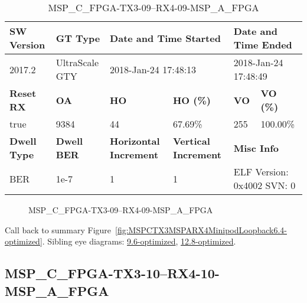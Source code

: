 \begin{table}[h]
\centering
\caption{MSP\_C\_FPGA-TX3-09--RX4-09-MSP\_A\_FPGA}
\label{tab:MSPCFPGATX309RX409MSPAFPGA6.4-optimized}
\begin{tabular}{@{}|l|l|l|l|l|l|@{}}
\toprule
\textbf{SW Version}                & \textbf{GT Type}   & \multicolumn{2}{l|}{\textbf{Date and Time Started}}            & \multicolumn{2}{l|}{\textbf{Date and Time Ended}}        \\ \midrule
2017.2                       & UltraScale GTY          & \multicolumn{2}{l|}{2018-Jan-24 17:48:13}                   & \multicolumn{2}{l|}{2018-Jan-24 17:48:49}               \\ \midrule
\textbf{Reset RX}                  & \textbf{OA} & \textbf{HO}   & \textbf{HO (\%)} & \textbf{VO} & \textbf{VO (\%)} \\ \midrule
true & 9384        & 44          & 67.69\%        & 255        & 100.00\%       \\ \midrule
\textbf{Dwell Type}                & \textbf{Dwell BER} & \textbf{Horizontal Increment} & \textbf{Vertical Increment}    & \multicolumn{2}{l|}{\textbf{Misc Info}}                  \\ \midrule
BER                            & 1e-7        & 1        & 1           & \multicolumn{2}{l|}{ELF Version: 0x4002 SVN: 0}                         \\ \bottomrule
\end{tabular}
\end{table}

\begin{figure}[h]
\caption{MSP\_C\_FPGA-TX3-09--RX4-09-MSP\_A\_FPGA} \label{fig:MSPCFPGATX309RX409MSPAFPGA6.4-optimized}
\end{figure}

Call back to summary Figure~\ref{fig:MSPCTX3MSPARX4MinipodLoopback6.4-optimized}.
Sibling eye diagrams: \hyperref[sec:MSPCFPGATX309RX409MSPAFPGA9.6-optimized]{9.6-optimized}, \hyperref[sec:MSPCFPGATX309RX409MSPAFPGA12.8-optimized]{12.8-optimized}.

\clearpage
\newpage


\subsection{MSP\_C\_FPGA-TX3-10--RX4-10-MSP\_A\_FPGA}\label{sec:MSPCFPGATX310RX410MSPAFPGA6.4-optimized}

